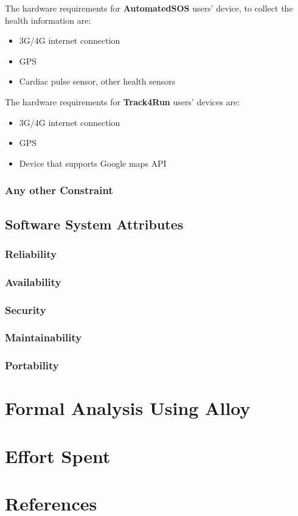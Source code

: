 \documentclass[a4paper]{article}
\begin{document}
\noindent The hardware requirements for \textbf{AutomatedSOS} users' device, to collect the health information are:
    \begin{itemize}
        \item 3G/4G internet connection
        \item GPS
        \item Cardiac pulse sensor, other health sensors
    \end{itemize}
\noindent The hardware requirements for \textbf{Track4Run} users' devices are:
    \begin{itemize}
        \item 3G/4G internet connection
        \item GPS
        \item Device that supports Google maps API
    \end{itemize}
    
    \subsubsection{Any other Constraint}
    
    
    
    \subsection{Software System Attributes}
    
    \subsubsection{Reliability}
    
    \subsubsection{Availability}
    
    \subsubsection{Security}
    
    \subsubsection{Maintainability}
    
    \subsubsection{Portability}
    
    \section{Formal Analysis Using Alloy}
    
    \section{Effort Spent}
    
    \section{References}
    
    
    
\end{document}
